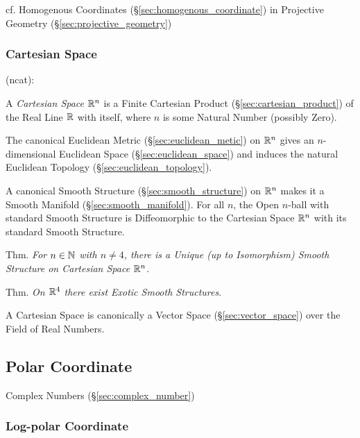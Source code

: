 cf. Homogenous Coordinates (\S\ref{sec:homogenous_coordinate}) in Projective
Geometry (\S\ref{sec:projective_geometry})



\subsubsection{Cartesian Space}\label{sec:cartesian_space}

(ncat):

A \emph{Cartesian Space} $\mathbb{R}^n$ is a Finite Cartesian Product
(\S\ref{sec:cartesian_product}) of the Real Line $\mathbb{R}$ with itself, where
$n$ is some Natural Number (possibly Zero).

The canonical Euclidean Metric (\S\ref{sec:euclidean_metic}) on $\mathbb{R}^n$
gives an $n$-dimensional Euclidean Space (\S\ref{sec:euclidean_space}) and
induces the natural Euclidean Topology (\S\ref{sec:euclidean_topology}).

A canonical Smooth Structure (\S\ref{sec:smooth_structure}) on $\mathbb{R}^n$ makes
it a Smooth Manifold (\S\ref{sec:smooth_manifold}). For all $n$, the Open
$n$-ball with standard Smooth Structure is Diffeomorphic to the Cartesian Space
$\mathbb{R}^n$ with its standard Smooth Structure.

Thm. \emph{For $n \in \mathbb{N}$ with $n \neq 4$, there is a Unique (up to
  Isomorphism) Smooth Structure on Cartesian Space $\mathbb{R}^n$}.

Thm. \emph{On $\mathbb{R}^4$ there exist Exotic Smooth Structures}.

A Cartesian Space is canonically a Vector Space (\S\ref{sec:vector_space}) over
the Field of Real Numbers.



\subsection{Polar Coordinate}\label{sec:polar_coordinate}

\fist Complex Numbers (\S\ref{sec:complex_number})



\subsubsection{Log-polar Coordinate}\label{sec:logpolar_coordinate}


